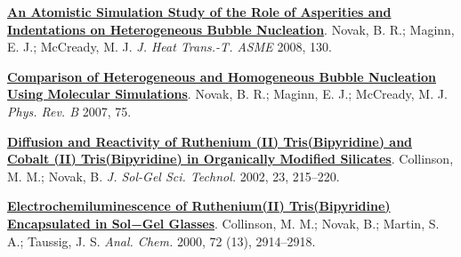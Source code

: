 \begin{cventries}
{\begin{cvitems}
        \item{\href{https://doi.org/10.1115/1.2818771}{\textbf{An Atomistic Simulation Study of the Role of Asperities and Indentations on Heterogeneous Bubble Nucleation}}. Novak, B. R.; Maginn, E. J.; McCready, M. J. \textit{J. Heat Trans.-T. ASME} 2008, 130.}
        \item{\href{https://doi.org/10.1103/PhysRevB.75.085413}{\textbf{Comparison of Heterogeneous and Homogeneous Bubble Nucleation Using Molecular Simulations}}. Novak, B. R.; Maginn, E. J.; McCready, M. J. \textit{Phys. Rev. B} 2007, 75. }
        \item{\href{https://doi.org/10.1023/A:1013966629311}{\textbf{Diffusion and Reactivity of Ruthenium (II) Tris(Bipyridine) and Cobalt (II) Tris(Bipyridine) in Organically Modified Silicates}}. Collinson, M. M.; Novak, B. \textit{J. Sol-Gel Sci. Technol.} 2002, 23, 215–220.}
        \item{\href{https://doi.org/10.1021/ac9913208}{\textbf{Electrochemiluminescence of Ruthenium(II) Tris(Bipyridine) Encapsulated in Sol−Gel Glasses}}. Collinson, M. M.; Novak, B.; Martin, S. A.; Taussig, J. S. \textit{Anal. Chem.} 2000, 72 (13), 2914–2918.}        
      \end{cvitems}
    }
    

\end{cventries}
